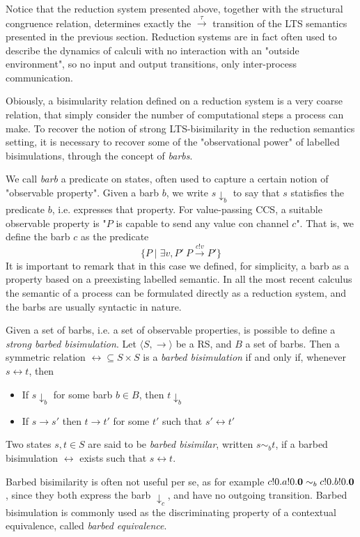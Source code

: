 Notice that the reduction system presented above, together with the structural congruence relation, determines exactly the $\xrightarrow{\tau}$ transition of the LTS semantics presented in the previous section. Reduction systems are in fact often used to describe the dynamics of calculi with no interaction with an "outside environment", so no input and output transitions, only inter-process communication.


Obiously, a bisimularity relation defined on a reduction system is a very coarse relation, that simply consider the number of computational steps a process can make. To recover the notion of strong LTS-bisimilarity in the reduction semantics setting, it is necessary to recover some of the "observational power" of labelled bisimulations, through the concept of \textit{barbs}.

We call \textit{barb} a predicate on states, often used to capture a certain notion of "observable property". Given a barb $b$, we write $s\downarrow_b$ to say that $s$ statisfies the predicate $b$, i.e. expresses that property. For value-passing CCS, a suitable observable property is "$P$ is capable to send any value con channel $c$". That is, we define the barb $c$ as the predicate 
\[\{P \mid \exists v, P' \ P \xrightarrow{c!v} P'\}\]
It is important to remark that in this case we defined, for simplicity, a barb as a property based on a preexisting labelled semantic. In all the most recent calculus the semantic of a process can be formulated directly as a reduction system, and the barbs are usually syntactic in nature.

Given a set of barbs, i.e. a set of observable properties, is possible to define a \textit{strong barbed bisimulation}.
Let $\langle S , \rightarrow \rangle$ be a RS, and $B$ a set of barbs. Then a symmetric relation $\rel \subseteq S \times S$ is a \textit{barbed bisimulation} if and only if, whenever $s \rel t$, then 
\begin{itemize}
\item If $s \downarrow_b$ for some barb $b \in B$, then $t \downarrow_b$
\item If $s \rightarrow s'$ then $t \rightarrow t'$ for some $t'$ such that $s' \rel t'$
\end{itemize}
Two states $s, t \in S$ are said to be \textit{barbed bisimilar}, written $s \sim_b t$, if a barbed bisimulation $\rel$ exists such that $s \rel t$.

Barbed bisimilarity is often not useful per se, as for example $c!0.a!0.\mathbf{0} \sim_b c!0.b!0.\mathbf{0}$, since they both express the barb $\downarrow_c$, and have no outgoing transition. Barbed bisimulation is commonly used as the discriminating property of a contextual equivalence, called \textit{barbed equivalence}.


